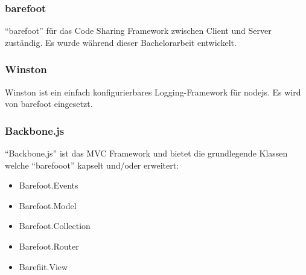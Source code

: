 \subsubsection*{barefoot}
``barefoot'' \cite{Barefoot} für das Code Sharing Framework zwischen Client und Server zuständig. Es wurde während dieser Bachelorarbeit entwickelt.

\subsubsection*{Winston}
Winston \cite{Winston} ist ein einfach konfigurierbares Logging-Framework für \gls{nodejs}. Es wird von barefoot eingesetzt.

\subsubsection*{Backbone.js}
``Backbone.js'' \cite{Backbonejs} ist das MVC Framework und bietet die grundlegende Klassen welche ``barefooot'' kapselt und/oder erweitert:

\begin{itemize}
	\item Barefoot.Events
	\item Barefoot.Model
	\item Barefoot.Collection
	\item Barefoot.Router
	\item Barefiit.View
\end{itemize}